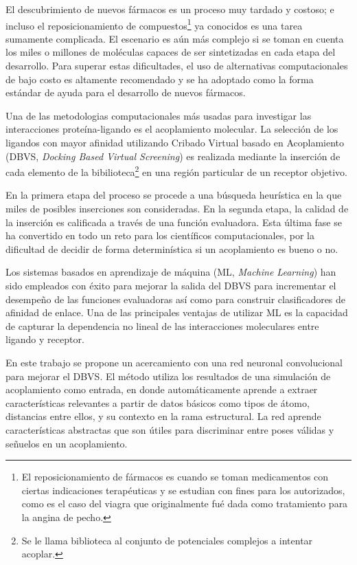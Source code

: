 El descubrimiento de nuevos fármacos es un proceso muy tardado y
costoso; e incluso el reposicionamiento de compuestos\footnote{El
reposicionamiento de fármacos es cuando se toman medicamentos con
ciertas indicaciones terapéuticas y se estudian con fines para los
autorizados, como es el caso del viagra que originalmente fué dada
como tratamiento para la angina de pecho.} ya conocidos es una tarea
sumamente complicada. El escenario es aún más complejo si se toman en
cuenta los miles o millones de moléculas capaces de ser sintetizadas
en cada etapa del desarrollo.  Para superar estas dificultades, el uso
de alternativas computacionales de bajo costo es altamente recomendado
y se ha adoptado como la forma estándar de ayuda para el desarrollo de
nuevos fármacos.

Una de las metodologias computacionales más usadas para investigar las
interacciones proteína-ligando es el acoplamiento molecular. La
selección de los ligandos con mayor afinidad utilizando Cribado
Virtual basado en Acoplamiento (DBVS, \textit{Docking Based Virtual
Screening}) es realizada mediante la inserción de cada elemento de la
bibilioteca\footnote{Se le llama biblioteca al conjunto de potenciales
complejos a intentar acoplar.} en una región particular de un receptor
objetivo.

En la primera etapa del proceso se procede a una búsqueda heurística
en la que miles de posibles inserciones son consideradas. En la
segunda etapa, la calidad de la inserción es calificada a través de
una función evaluadora. Esta última fase se ha convertido en todo un
reto para los científicos computacionales, por la dificultad de
decidir de forma determinística si un acoplamiento es bueno o no.

Los sistemas basados en aprendizaje de máquina (ML, \textit{Machine
  Learning}) han sido empleados con éxito para mejorar la salida del DBVS
para incrementar el desempeño de las funciones evaluadoras así como
para construir clasificadores de afinidad de enlace\cite{arciniega}. Una de las
principales ventajas de utilizar ML es la capacidad de capturar la
dependencia no lineal de las interacciones moleculares entre ligando y
receptor.

En este trabajo se propone un acercamiento con una red neuronal
convolucional para mejorar el DBVS. El método utiliza los resultados
de una simulación de acoplamiento como entrada, en donde
automáticamente aprende a extraer características relevantes a partir
de datos básicos como tipos de átomo, distancias entre ellos, y su
contexto en la rama estructural. La red aprende características
abstractas que son útiles para discriminar entre poses válidas y
señuelos en un acoplamiento.
